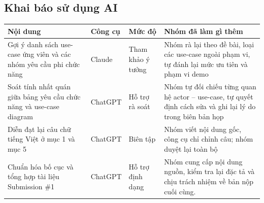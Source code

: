 \subsection{Khai báo sử dụng AI}

\begin{longtable}{|
    >{\raggedright\arraybackslash}p{}|
    >{\raggedright\arraybackslash}p{}|
    >{\raggedright\arraybackslash}p{}|
    >{\raggedright\arraybackslash}p{}|}

\hline
\textbf{Nội dung} & \textbf{Công cụ} & \textbf{Mức độ} & \textbf{Nhóm đã làm gì thêm} \\
\hline
\endhead

\hline
\endfoot

\hline
\endlastfoot

Gợi ý danh sách use-case ứng viên và các nhóm yêu cầu phi chức năng & Claude & Tham khảo ý tưởng & Nhóm rà lại theo đề bài, loại các use-case ngoài phạm vi, tự đánh lại mức ưu tiên và phạm vi demo \\
\hline
Soát tính nhất quán giữa bảng yêu cầu chức năng và use-case diagram & ChatGPT & Hỗ trợ rà soát & Nhóm tự đối chiếu từng quan hệ actor -- use-case, tự quyết định cách sửa và ghi lại lý do trong biên bản họp \\
\hline
Diễn đạt lại câu chữ tiếng Việt ở mục 1 và mục 5 & ChatGPT & Biên tập & Nhóm viết nội dung gốc, công cụ chỉ chỉnh câu; nhóm duyệt lại toàn bộ \\
\hline
Chuẩn hóa bố cục và tổng hợp tài liệu Submission \#1 & ChatGPT & Hỗ trợ định dạng & Nhóm cung cấp nội dung nguồn, kiểm tra lại đặc tả và chịu trách nhiệm về bản nộp cuối cùng. \\
\hline

\end{longtable}